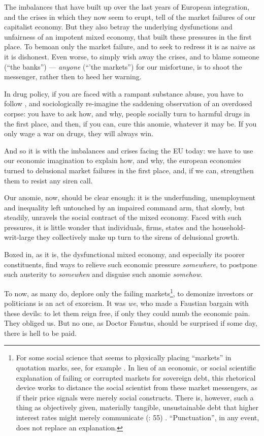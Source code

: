 The imbalances that have built up over the last years of European integration, and the crises in which they now seem to erupt, tell of the market failures of our capitalist economy. But they also betray the underlying dysfunctions and unfairness of an impotent mixed economy, that built these pressures in the first place. To bemoan only the market failure, and to seek to redress it is as naive as it is dishonest. Even worse, to simply wish away the crises, and to blame someone (``the banks'') --- \emph{anyone} (``'the markets'') for our misfortune, is to shoot the messenger, rather then to heed her warning.

In drug policy, if you are faced with a rampant substance abuse, you have to follow \cite{Mills-1959-aa}, and sociologically re-imagine the saddening observation of an overdosed corpse: you have to ask how, and why, people socially turn to harmful drugs in the first place, and then, if you can, cure this anomie, whatever it may be. If you only wage a war on drugs, they will always win.

And so it is with the imbalances and crises facing the \gls{EU} today: we have to use our economic imagination to explain how, and why, the european economies turned to delusional market failures in the first place, and, if we can, strengthen them to resist any siren call. 

Our anomie, now, should be clear enough: it is the underfunding, unemployment and inequality left untouched by an impaired command arm, that slowly, but steadily, unravels the social contract of the mixed economy. Faced with such pressures, it is little wonder that individuals, firms, states and the household-writ-large they collectively make up turn to the sirens of delusional growth.

Boxed in, as it is, the dysfunctional mixed economy, and especially its poorer constituents, find ways to relieve such economic pressure \emph{somewhere}, to postpone such austerity to \emph{somewhen} and disguise such anomie \emph{somehow}. 

To now, as many do, deplore only the failing markets\footnote{
	For some social science that seems to physically placing ``markets'' in quotation marks, see, for example \citealt{Beckert2012}. In lieu of an economic, or social scientific explanation of failing or corrupted markets for sovereign debt, this rhetorical device works to distance the social scientist from these market messengers, as if their price signals were merely social constructs. There is, however, such a thing as objectively given, materially tangible, unsustainable debt that higher interest rates might merely communicate (\citealt{Wihlborg2010}: 55) . ``Punctuation'', in any event, does not replace an explanation.}, 
to demonize investors or politicians is an act of exorcism. It was \emph{we}, who made a Faustian bargain with these devils: to let them reign free, if only they could numb the economic pain. They obliged us. But no one, as Doctor Faustus, should be surprised if some day, there is hell to be paid.

